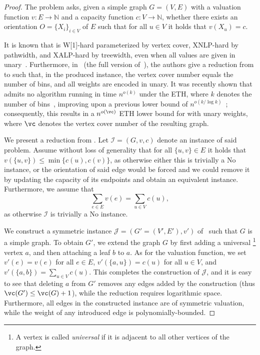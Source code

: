\documentclass[11pt,letterpaper]{article}
\begin{document}
\begin{proof}
    The {\TOO} problem asks,
    given a simple graph $G=(V,E)$ with a valuation function $v \colon E \to \mathbb{N}$
    and a capacity function $c \colon V \to \mathbb{N}$,
    whether there exists an orientation $O = \{X_i\}_{i \in V}$ of $E$ such that
    for all $u \in V$ it holds that $v(X_u)=c$.

    It is known that {\TOO} is W[1]-hard parameterized by vertex cover,
    XNLP-hard by pathwidth,
    and XALP-hard by treewidth, even when all values are given in unary~\cite{wg/BodlaenderCW22,dam/BodlaenderS26}.
    Furthermore, in~\cite[Theorem~6.4]{arxiv/BodlaenderCW22} (the full version of~\cite{wg/BodlaenderCW22}),
    the authors give a reduction from {\UBP} to {\TOO} such that,
    in the produced instance, the vertex cover number equals the number of bins,
    and all weights are encoded in unary.
    It was recently shown that {\UBP} admits no algorithm running in time $n^{o(k)}$ under the ETH,
    where $k$ denotes the number of bins~\cite{bringmann2026tightsethbasedlowerbounds},
    improving upon a previous lower bound of $n^{o(k/\log k)}$~\cite{jcss/JansenKMS13};
    consequently, this results in a $n^{o(\vc)}$ ETH lower bound for {\TOO} with unary weights,
    where $\vc$ denotes the vertex cover number of the resulting graph.

    We present a reduction from {\TOO}.
    Let $\mathcal{I} =  (G,v,c)$ denote an instance of said problem.
    Assume without loss of generality that for all $\{u,v\} \in E$ it holds that $v(\{u,v\}) \le \min\{c(u),c(v)\}$,
    as otherwise either this is trivially a No instance, or the orientation of said edge would be forced and we could remove it
    by updating the capacity of its endpoints and obtain an equivalent instance.
    Furthermore, we assume that
    \begin{equation}\label{eq:w1h-ef}
        \sum_{e \in E} v(e) = \sum_{u \in V} c(u),
    \end{equation}
    as otherwise $\mathcal{I}$ is trivially a No instance.

    We construct a symmetric instance $\mathcal{J} = (G'=(V',E'),v')$ of \EFo\ such that $G$ is a simple graph.
    To obtain $G'$, we extend the graph $G$ by first adding a universal%
    \footnote{A vertex is called \emph{universal} if it is adjacent to all other vertices of the graph.}
    vertex $a$, and then attaching a leaf $b$ to $a$.
    As for the valuation function, we set $v'(e) = v(e)$ for all $e \in E$,
    $v'(\{a,u\})=c(u)$ for all $u \in V$, and $v'(\{a,b\}) = \sum_{u \in V} c(u)$.
    This completes the construction of $\mathcal{J}$,
    and it is easy to see that deleting $a$ from $G'$ removes any edges added by the construction (thus $\vc(G') \le \vc(G) + 1$),
    while the reduction requires logarithmic space.
    Furthermore, all edges in the constructed instance are of symmetric valuation,
    while the weight of any introduced edge is polynomially-bounded.


\end{proof}
\end{document}
